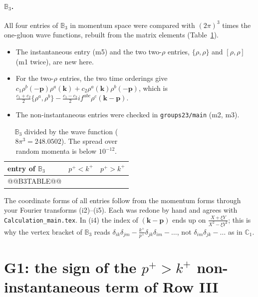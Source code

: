 \documentclass[10pt]{article}
\numberwithin{equation}{section}
\def\mf#1{\mathbb{#1}}
\newcommand{\bk}{\mathbf k}
\newcommand{\bp}{\mathbf p}
\begin{document}
\paragraph{$\mf B_3$.} All four entries of $\mf B_3$ in momentum space were compared with $(2\pi)^3$ times the one-gluon wave functions, rebuilt from the matrix elements (Table~\ref{tab:B3}).
\begin{itemize}
\item The instantaneous entry (m5) and the two two-$\rho$ entries, $\{\rho,\rho\}$ and $[\rho,\rho]$ (m1 twice), are new here.
\item For the two-$\rho$ entries, the two time orderings give $c_1\rho^b(-\bp)\rho^a(\bk)+c_2\rho^a(\bk)\rho^b(-\bp)$, which is $\frac{c_1+c_2}{2}\{\rho^a,\rho^b\}-\frac{c_1-c_2}{2}if^{abc}\rho^c(\bk-\bp)$.
\item The non-instantaneous entries were checked in \texttt{groups23/main} (m2, m3).
\end{itemize}
\begin{table}[H]\centering\small
\begin{tabular}{@{}lcc@{}}\toprule
entry of $\mf B_3$ & $p^+<k^+$ & $p^+>k^+$\\\midrule
@@B3TABLE@@
\bottomrule\end{tabular}
\caption{$\mf B_3$ divided by the wave function ($8\pi^3=248.0502$). The spread over random momenta is below $10^{-12}$.}\label{tab:B3}
\end{table}
The coordinate forms of all entries follow from the momentum forms through your Fourier transforms (i2)--(i5). Each was redone by hand and agrees with \texttt{Calculation\_main.tex}. In (i4) the index of $(\bk-\bp)$ ends up on $\frac{X+\xi Y}{X^2-\xi Y^2}$; this is why the vertex bracket of $\mf B_3$ reads $\delta_{ik}\delta_{jm}-\frac{k^+}{p^+}\delta_{jk}\delta_{im}-\dots$, not $\delta_{im}\delta_{jk}-\dots$ as in $\mf C_1$.

\section{G1: the sign of the \texorpdfstring{$p^+>k^+$}{p+>k+} non-instantaneous term of Row III}\label{sec:G1}
\end{document}

